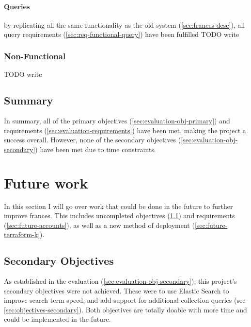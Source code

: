 \documentclass[12pt, letterpaper]{article}
\begin{document}
\paragraph{Queries}

\begin{flushleft}
by replicating all the same functionality as the old system (\ref{sec:frances-desc}), all query requirements (\ref{sec:req-functional-query}) have been fulfilled
TODO write
\end{flushleft}

\subsubsection{Non-Functional}

\begin{flushleft}
TODO write
\end{flushleft}

\subsection{Summary}

\begin{flushleft}
In summary, all of the primary objectives (\ref{sec:evaluation-obj-primary}) and requirements (\ref{sec:evaluation-requirements}) have been met, making the project a success overall. However, none of the secondary objectives (\ref{sec:evaluation-obj-secondary}) have been met due to time constraints. 
\end{flushleft}

\section{Future work}\label{sec:future-work}

\begin{flushleft}
In this section I will go over work that could be done in the future to further improve frances. This includes uncompleted objectives (\ref{sec:future-secondary-obj}) and requirements (\ref{sec:future-accounts}), as well as a new method of deployment (\ref{sec:future-terraform-k}).
\end{flushleft}

\subsection{Secondary Objectives}\label{sec:future-secondary-obj}

\begin{flushleft}
As established in the evaluation (\ref{sec:evaluation-obj-secondary}), this project's secondary objectives were not achieved. These were to use Elastic Search to improve search term speed, and add support for additional collection queries (see \ref{sec:objectives-secondary}). Both objectives are totally doable with more time and could be implemented in the future.
\end{flushleft}
\end{document}
